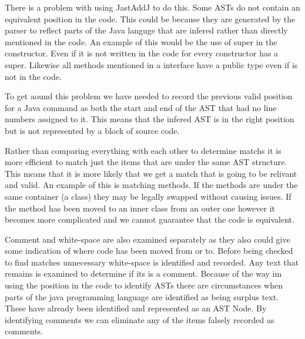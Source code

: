 There is a problem with using JastAddJ to do this. Some ASTs do not contain an equivalent position in the code.  This could be because they are generated by the parser to reflect parts of the Java languge that are infered rather than directly mentioned in the code.  An example of this would be the use of super in the constructor.  Even if it is not written in the code for every constructor has a super. Likewise all methods mentioned in a interface have a public type even if is not in the code.

To get aound this problem we have needed to record the previous valid position for a Java command as both the start and end of the AST that had no line numbers assigned to it.  This means that the infered AST is in the right position but is not represented by a block of source code.



Rather than comparing everything with each other to determine matchs it is more efficient to match just the items that are under the same AST structure.  This means that it is more likely that we get a match that is going to be relivant and valid.  An example of this is matching methods. If the methods are under the same container (a class) they may be legally swapped without causing issues.  If the method has been moved to an inner class from an outer one however it becomes more complicated and we cannot guarantee that the code is equivalent.     

Comment and white-space are also examined separately as they also could give some indication of where code has been moved from or to.
Before being checked to find matches unnecessary white-space is identified and recorded.
Any text that remains is examined to determine if its is a comment.  Because of the way im using the position in the code to identify ASTs there are circumstances when parts of the java programming language are identified as being surplus text. These have already been identified and represented as an AST Node. By identifying comments we can eliminate any of the items falsely recorded as comments.

